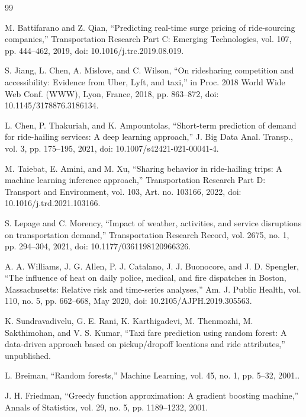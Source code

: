 \documentclass[letterpaper, 10 pt, conference]{ieeeconf}  %
\begin{document}
 
\begin{thebibliography}{99}


 M. Battifarano and Z. Qian, “Predicting real-time surge pricing of ride-sourcing companies,” Transportation Research Part C: Emerging Technologies, vol. 107, pp. 444–462, 2019, doi: 10.1016/j.trc.2019.08.019.

 S. Jiang, L. Chen, A. Mislove, and C. Wilson, “On ridesharing competition and accessibility: Evidence from Uber, Lyft, and taxi,” in Proc. 2018 World Wide Web Conf. (WWW), Lyon, France, 2018, pp. 863–872, doi: 10.1145/3178876.3186134.

L. Chen, P. Thakuriah, and K. Ampountolas, “Short-term prediction of demand for ride-hailing services: A deep learning approach,” J. Big Data Anal. Transp., vol. 3, pp. 175–195, 2021, doi: 10.1007/s42421-021-00041-4.


 M. Taiebat, E. Amini, and M. Xu, “Sharing behavior in ride-hailing trips: A machine learning inference approach,” Transportation Research Part D: Transport and Environment, vol. 103, Art. no. 103166, 2022, doi: 10.1016/j.trd.2021.103166.

 S. Lepage and C. Morency, “Impact of weather, activities, and service disruptions on transportation demand,” Transportation Research Record, vol. 2675, no. 1, pp. 294–304, 2021, doi: 10.1177/0361198120966326.

 A. A. Williams, J. G. Allen, P. J. Catalano, J. J. Buonocore, and J. D. Spengler, “The influence of heat on daily police, medical, and fire dispatches in Boston, Massachusetts: Relative risk and time-series analyses,” Am. J. Public Health, vol. 110, no. 5, pp. 662–668, May 2020, doi: 10.2105/AJPH.2019.305563.

 K. Sundravadivelu, G. E. Rani, K. Karthigadevi, M. Thenmozhi, M. Sakthimohan, and V. S. Kumar, “Taxi fare prediction using random forest: A data-driven approach based on pickup/dropoff locations and ride attributes,” unpublished.

 L. Breiman, “Random forests,” Machine Learning, vol. 45, no. 1, pp. 5–32, 2001..

 J. H. Friedman, “Greedy function approximation: A gradient boosting machine,” Annals of Statistics, vol. 29, no. 5, pp. 1189–1232, 2001.






\end{thebibliography}
\end{document}

